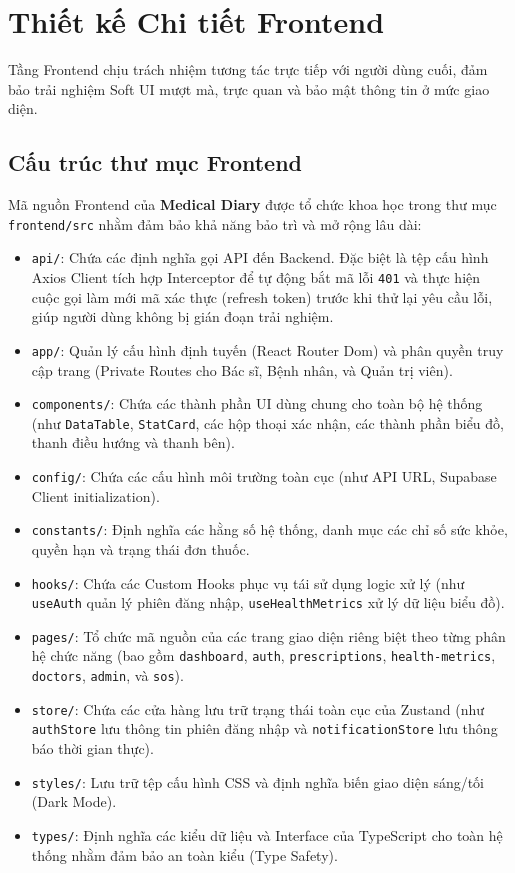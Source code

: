 \documentclass[12pt,a4paper]{report}
\begin{document}
\section{Thiết kế Chi tiết Frontend}

Tầng Frontend chịu trách nhiệm tương tác trực tiếp với người dùng cuối, đảm bảo trải nghiệm Soft UI mượt mà, trực quan và bảo mật thông tin ở mức giao diện.

\subsection{Cấu trúc thư mục Frontend}

Mã nguồn Frontend của \textbf{Medical Diary} được tổ chức khoa học trong thư mục \texttt{frontend/src} nhằm đảm bảo khả năng bảo trì và mở rộng lâu dài:

\begin{itemize}[leftmargin=1.5em, itemsep=4pt]
    \item \texttt{api/}: Chứa các định nghĩa gọi API đến Backend. Đặc biệt là tệp cấu hình Axios Client tích hợp Interceptor để tự động bắt mã lỗi \texttt{401} và thực hiện cuộc gọi làm mới mã xác thực (refresh token) trước khi thử lại yêu cầu lỗi, giúp người dùng không bị gián đoạn trải nghiệm.
    \item \texttt{app/}: Quản lý cấu hình định tuyến (React Router Dom) và phân quyền truy cập trang (Private Routes cho Bác sĩ, Bệnh nhân, và Quản trị viên).
    \item \texttt{components/}: Chứa các thành phần UI dùng chung cho toàn bộ hệ thống (như \texttt{DataTable}, \texttt{StatCard}, các hộp thoại xác nhận, các thành phần biểu đồ, thanh điều hướng và thanh bên).
    \item \texttt{config/}: Chứa các cấu hình môi trường toàn cục (như API URL, Supabase Client initialization).
    \item \texttt{constants/}: Định nghĩa các hằng số hệ thống, danh mục các chỉ số sức khỏe, quyền hạn và trạng thái đơn thuốc.
    \item \texttt{hooks/}: Chứa các Custom Hooks phục vụ tái sử dụng logic xử lý (như \texttt{useAuth} quản lý phiên đăng nhập, \texttt{useHealthMetrics} xử lý dữ liệu biểu đồ).
    \item \texttt{pages/}: Tổ chức mã nguồn của các trang giao diện riêng biệt theo từng phân hệ chức năng (bao gồm \texttt{dashboard}, \texttt{auth}, \texttt{prescriptions}, \texttt{health-metrics}, \texttt{doctors}, \texttt{admin}, và \texttt{sos}).
    \item \texttt{store/}: Chứa các cửa hàng lưu trữ trạng thái toàn cục của Zustand (như \texttt{authStore} lưu thông tin phiên đăng nhập và \texttt{notificationStore} lưu thông báo thời gian thực).
    \item \texttt{styles/}: Lưu trữ tệp cấu hình CSS và định nghĩa biến giao diện sáng/tối (Dark Mode).
    \item \texttt{types/}: Định nghĩa các kiểu dữ liệu và Interface của TypeScript cho toàn hệ thống nhằm đảm bảo an toàn kiểu (Type Safety).
\end{itemize}
\end{document}
